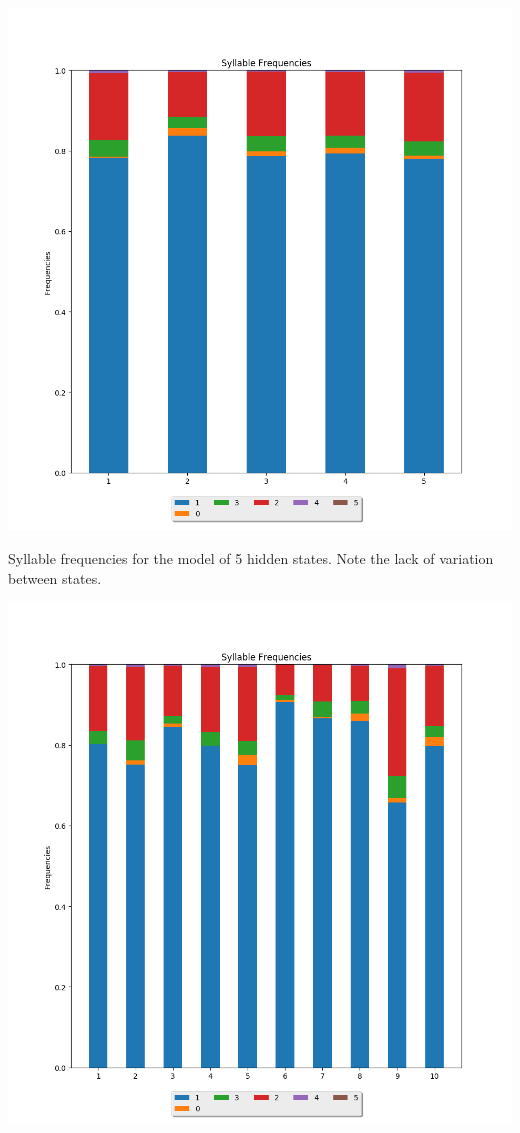 \begin{center}
\includegraphics[scale=0.5]{../src/results/syllables_5}
\end{center}

Syllable frequencies for the model of 5 hidden states. Note the lack of variation between states.

\begin{center}
\includegraphics[scale=0.6]{../src/results/syllables_10}
\end{center}

